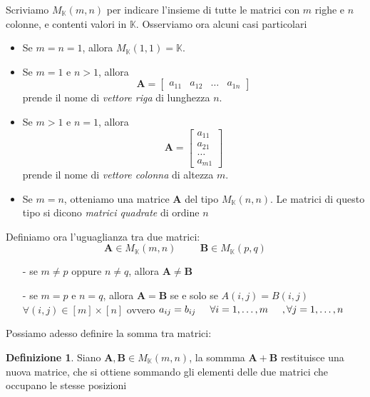 \documentclass[a4paper, 12pt]{article}
\theoremstyle{definition}
\newtheorem{defn}[thm]{Definizione}
\begin{document}
\noindent Scriviamo $M_\mathds{K}(m, n)$ per indicare l'insieme di tutte le matrici con $m$ righe e $n$ colonne, e contenti valori in $\mathds{K}$.
Osserviamo ora alcuni casi particolari
\begin{itemize}
    \item Se \( m = n = 1 \), allora \( M_\mathds{K}(1, 1) = \mathds{K} \).
    \item Se \( m = 1 \) e \( n > 1 \), allora
    \[
    \mathbf{A} = \begin{bmatrix}
    a_{11} & a_{12} & \dots & a_{1n}
    \end{bmatrix}
    \]
    prende il nome di \textit{vettore riga} di lunghezza $n$.
    \item Se \( m > 1 \) e \( n = 1 \), allora
    \[
    \mathbf{A} = \begin{bmatrix}
    a_{11} \\ a_{21} \\ \dots \\ a_{m1}
    \end{bmatrix}
    \]
    prende il nome di \textit{vettore colonna} di altezza $m$.
    \item Se \( m = n \), otteniamo una matrice $\mathbf{A}$ del tipo $M_\mathds{K}(n, n)$. Le matrici di questo tipo si dicono \textit{matrici quadrate} di ordine $n$
\end{itemize}
\noindent Definiamo ora l'uguaglianza tra due matrici:
\[
\mathbf{A} \in M_\mathds{K}(m, n) \hspace{1cm} \mathbf{B} \in M_\mathds{K}(p, q)
\]
\begin{itemize}
    \item[-] se $m \neq p$ oppure $n \neq q$, allora $\mathbf{A} \neq \mathbf{B}$
    \item[-] se $m = p$ e $n = q$, allora $\mathbf{A} = \mathbf{B}$ se e solo se $A(i,j) = B(i,j) $ \hspace{1cm} $ \forall(i,j) \in [m]\times[n]$
    ovvero $a_{ij} = b_{ij} \hspace{0.5cm} \forall{i = 1,\dots,m} \hspace{0.5cm}, \forall{j = 1,\dots,n}$
\end{itemize}
\noindent Possiamo adesso definire la somma tra matrici:
\begin{defn}
    Siano $\mathbf{A}, \mathbf{B} \in  M_\mathds{K}(m, n)$, la sommma  $\mathbf{A} + \mathbf{B}$ restituisce una nuova matrice, che si ottiene sommando gli elementi delle due matrici che occupano le stesse posizioni
\end{defn}
\end{document}
